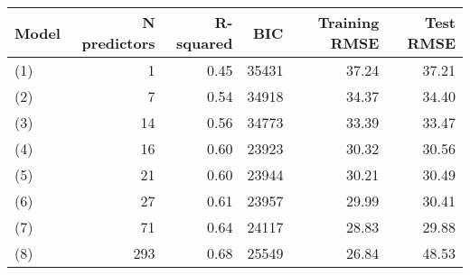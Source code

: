 \begin{tabular}{lrrrrr}
  \toprule
Model & N predictors & R-squared & BIC & Training RMSE & Test RMSE \\ 
  \midrule
(1) & 1 & 0.45 & 35431 & 37.24 & 37.21 \\ 
  (2) & 7 & 0.54 & 34918 & 34.37 & 34.40 \\ 
  (3) & 14 & 0.56 & 34773 & 33.39 & 33.47 \\ 
  (4) & 16 & 0.60 & 23923 & 30.32 & 30.56 \\ 
  (5) & 21 & 0.60 & 23944 & 30.21 & 30.49 \\ 
  (6) & 27 & 0.61 & 23957 & 29.99 & 30.41 \\ 
  (7) & 71 & 0.64 & 24117 & 28.83 & 29.88 \\ 
  (8) & 293 & 0.68 & 25549 & 26.84 & 48.53 \\ 
   \bottomrule
\end{tabular}
